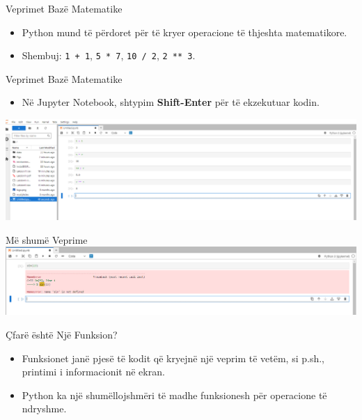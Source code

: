 \documentclass[
  ignorenonframetext,
]{beamer}
\providecommand{\tightlist}{%
  \setlength{\itemsep}{0pt}\setlength{\parskip}{0pt}}
\begin{document}
\begin{frame}[fragile]{Veprimet Bazë Matematike}
\protect\hypertarget{veprimet-bazuxeb-matematike}{}
\begin{itemize}
\item
  Python mund të përdoret për të kryer operacione të thjeshta
  matematikore.
\item
  Shembuj: \texttt{1\ +\ 1}, \texttt{5\ *\ 7}, \texttt{10\ /\ 2},
  \texttt{2\ **\ 3}.
\end{itemize}
\end{frame}

\begin{frame}{Veprimet Bazë Matematike}
\protect\hypertarget{veprimet-bazuxeb-matematike-1}{}
\begin{itemize}
\tightlist
\item
  Në Jupyter Notebook, shtypim \textbf{Shift-Enter} për të ekzekutuar
  kodin.
\end{itemize}

\includegraphics{./Figs/math1.png}
\end{frame}

\begin{frame}{Më shumë Veprime}
\protect\hypertarget{muxeb-shumuxeb-veprime}{}
\includegraphics{./Figs/math2.png}
\end{frame}

\begin{frame}{Çfarë është Një Funksion?}
\protect\hypertarget{uxe7faruxeb-uxebshtuxeb-njuxeb-funksion}{}
\begin{itemize}
\item
  Funksionet janë pjesë të kodit që kryejnë një veprim të vetëm, si
  p.sh., printimi i informacionit në ekran.
\item
  Python ka një shumëllojshmëri të madhe funksionesh për operacione të
  ndryshme.
\end{itemize}
\end{frame}
\end{document}

